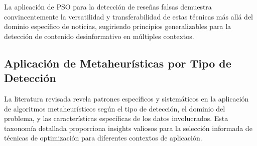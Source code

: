 La aplicación de PSO para la detección de reseñas falsas \cite{deshai2023unmasking} demuestra convincentemente la versatilidad y transferabilidad de estas técnicas más allá del dominio específico de noticias, sugiriendo principios generalizables para la detección de contenido desinformativo en múltiples contextos.

\subsection{Aplicación de Metaheurísticas por Tipo de Detección}
\label{subsec:metaheuristicas_por_tipo}

La literatura revisada revela patrones específicos y sistemáticos en la aplicación de algoritmos metaheurísticos según el tipo de detección, el dominio del problema, y las características específicas de los datos involucrados. Esta taxonomía detallada proporciona insights valiosos para la selección informada de técnicas de optimización para diferentes contextos de aplicación.

